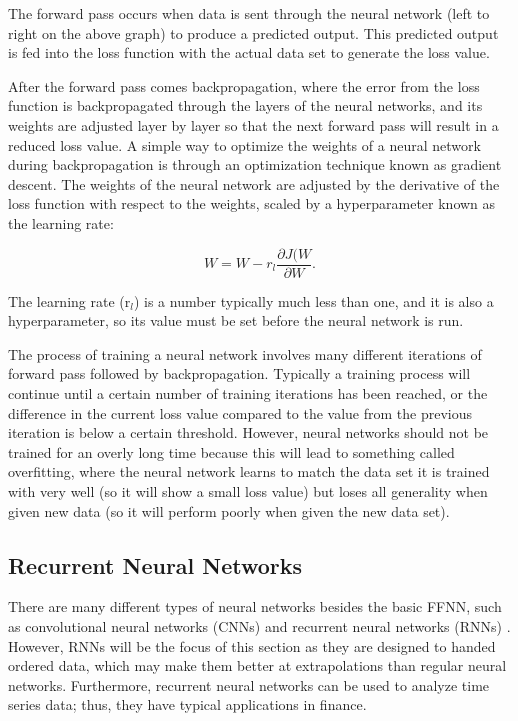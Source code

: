 
		The forward pass occurs when data is sent through the neural network (left to right on the above graph) to produce a predicted output. This predicted output is fed into the loss function with the actual data set to generate the loss value.


		After the forward pass comes backpropagation, where the error from the loss function is backpropagated through the layers of the neural networks, and its weights are adjusted layer by layer so that the next forward pass will result in a reduced loss value. A simple way to optimize the weights of a neural network during backpropagation is through an optimization technique known as gradient descent. The weights of the neural network are adjusted by the derivative of the loss function with respect to the weights, scaled by a hyperparameter known as the learning rate:

		$$W = W - r_{l}\frac{\partial J(W}{\partial W}.$$

		The learning rate (r$_l$) is a number typically much less than one, and it is also a hyperparameter, so its value must be set before the neural network is run.

		The process of training a neural network involves many different iterations of forward pass followed by backpropagation. Typically a training process will continue until a certain number of training iterations has been reached, or the difference in the current loss value compared to the value from the previous iteration is below a certain threshold. However, neural networks should not be trained for an overly long time because this will lead to something called overfitting, where the neural network learns to match the data set it is trained with very well (so it will show a small loss value) but loses all generality when given new data (so it will perform poorly when given the new data set).
	

\subsection*{Recurrent Neural Networks}
	There are many different types of neural networks besides the basic FFNN, such as convolutional neural networks (CNNs) and recurrent neural networks (RNNs) \cite{Ref6}. However, RNNs will be the focus of this section as they are designed to handed ordered data, which may make them better at extrapolations than regular neural networks. Furthermore, recurrent neural networks can be used to analyze time series data; thus, they have typical applications in finance.  

